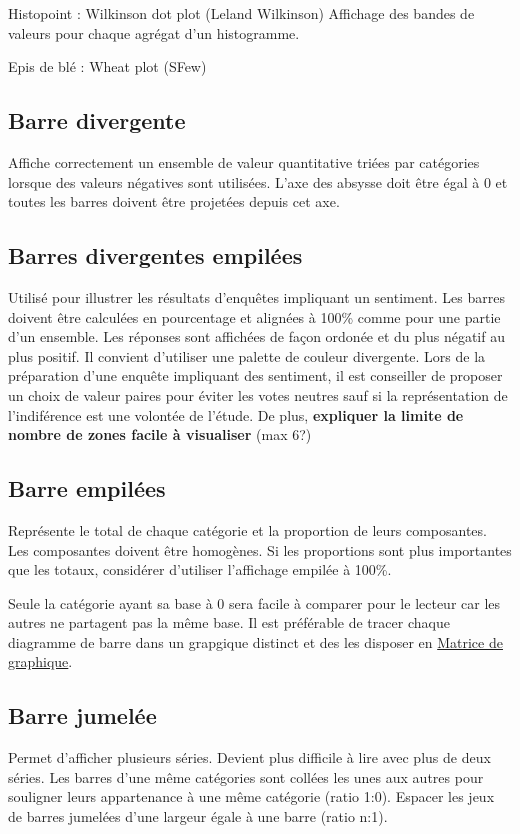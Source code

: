 \documentclass[a4paper,12pt]{article}
\begin{document}
\begin{multicols}{2}
Histopoint : Wilkinson dot plot (Leland Wilkinson) Affichage des bandes de valeurs pour chaque agrégat d'un histogramme.\autocite{jonathanschwabishDistribution2021}

Epis de blé : Wheat plot (SFew)
\subsection*{Barre divergente}
\label{sec:orgc1b7980}
Affiche correctement un ensemble de valeur quantitative triées par catégories lorsque des valeurs négatives sont utilisées. \autocite{alansmithLexiqueVisuel} L'axe des absysse doit être égal à 0 et toutes les barres doivent être projetées depuis cet axe.
\subsection*{Barres divergentes empilées}
\label{sec:org54d763f}
Utilisé pour illustrer les résultats d'enquêtes impliquant un sentiment. \autocite{alansmithLexiqueVisuel} Les barres doivent être calculées en pourcentage et alignées à 100\% comme pour une partie d'un ensemble. Les réponses sont affichées de façon ordonée et du plus négatif au plus positif. Il convient d'utiliser une palette de couleur divergente. Lors de la préparation d'une enquête impliquant des sentiment, il est conseiller de proposer un choix de valeur paires pour éviter les votes neutres sauf si la représentation de l'indiférence est une volontée de l'étude. De plus, \textbf{expliquer la limite de nombre de zones facile à visualiser} (max 6?)
\subsection*{Barre empilées}
\label{sec:orgf249410}
Représente le total de chaque catégorie et la proportion de leurs composantes. Les composantes doivent être homogènes. Si les proportions sont plus importantes que les totaux, considérer d'utiliser l'affichage empilée à 100\%. \autocite{mikeyiHowChooseRight2020}

Seule la catégorie ayant sa base à 0 sera facile à comparer pour le lecteur car les autres ne partagent pas la même base.\autocite{jonathanschwabishComparingCategories2021} Il est préférable de tracer chaque diagramme de barre dans un grapgique distinct et des les disposer en \hyperref[sec:org10b09f5]{Matrice de graphique}. \autocite{jonathanschwabishComparingCategories2021}
\subsection*{Barre jumelée}
\label{sec:orga0e0a6a}
Permet d'afficher plusieurs séries. Devient plus difficile à lire avec plus de deux séries. \autocite{alansmithLexiqueVisuel}
Les barres d'une même catégories sont collées les unes aux autres pour souligner leurs appartenance à une même catégorie (ratio 1:0). Espacer les jeux de barres jumelées d'une largeur égale à une barre (ratio n:1).


\end{multicols}
\end{document}
